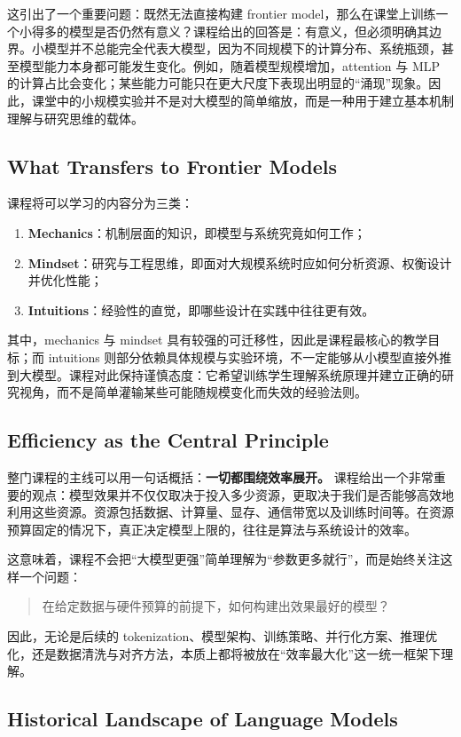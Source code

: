 \documentclass[a4paper,UTF8]{article}
\numberwithin{equation}{section}
\begin{document}
这引出了一个重要问题：既然无法直接构建 frontier model，那么在课堂上训练一个小得多的模型是否仍然有意义？课程给出的回答是：有意义，但必须明确其边界。小模型并不总能完全代表大模型，因为不同规模下的计算分布、系统瓶颈，甚至模型能力本身都可能发生变化。例如，随着模型规模增加，attention 与 MLP 的计算占比会变化；某些能力可能只在更大尺度下表现出明显的“涌现”现象。因此，课堂中的小规模实验并不是对大模型的简单缩放，而是一种用于建立基本机制理解与研究思维的载体。

\subsection{What Transfers to Frontier Models}

课程将可以学习的内容分为三类：
\begin{enumerate}
    \item \textbf{Mechanics}：机制层面的知识，即模型与系统究竟如何工作；
    \item \textbf{Mindset}：研究与工程思维，即面对大规模系统时应如何分析资源、权衡设计并优化性能；
    \item \textbf{Intuitions}：经验性的直觉，即哪些设计在实践中往往更有效。
\end{enumerate}
其中，mechanics 与 mindset 具有较强的可迁移性，因此是课程最核心的教学目标；而 intuitions 则部分依赖具体规模与实验环境，不一定能够从小模型直接外推到大模型。课程对此保持谨慎态度：它希望训练学生理解系统原理并建立正确的研究视角，而不是简单灌输某些可能随规模变化而失效的经验法则。

\subsection{Efficiency as the Central Principle}

整门课程的主线可以用一句话概括：\textbf{一切都围绕效率展开。} 课程给出一个非常重要的观点：模型效果并不仅仅取决于投入多少资源，更取决于我们是否能够高效地利用这些资源。资源包括数据、计算量、显存、通信带宽以及训练时间等。在资源预算固定的情况下，真正决定模型上限的，往往是算法与系统设计的效率。

这意味着，课程不会把“大模型更强”简单理解为“参数更多就行”，而是始终关注这样一个问题：
\begin{quote}
在给定数据与硬件预算的前提下，如何构建出效果最好的模型？
\end{quote}
因此，无论是后续的 tokenization、模型架构、训练策略、并行化方案、推理优化，还是数据清洗与对齐方法，本质上都将被放在“效率最大化”这一统一框架下理解。

\subsection{Historical Landscape of Language Models}
\end{document}
